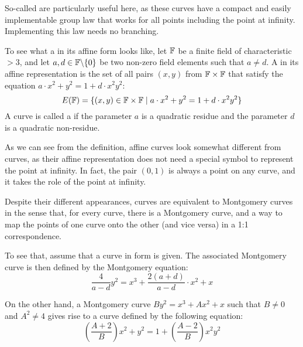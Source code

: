 So-called  are particularly useful here, as these curves have a compact and easily implementable group law that works for all points including the point at infinity. Implementing this law needs no branching. 

To see what a  in its affine form looks like, let $\mathbb{F}$ be a finite field of characteristic $>3$, and let $a,d\in \mathbb{F}\backslash\{0\}$ be two non-zero field elements such that $a\neq d$.  A  in its affine representation is  the set of all pairs $(x,y)$ from $\mathbb{F}\times \mathbb{F}$ that satisfy the  equation $a\cdot x^2+y^2= 1+d\cdot x^2y^2$:
\begin{equation}\label{eq:twisted-edwards}
E(\mathbb{F})=\{(x,y)\in\mathbb{F}\times\mathbb{F}\;|\; a\cdot x^2+y^2= 1+d\cdot x^2y^2\}
\end{equation} 
A  curve is called a  if the parameter $a$ is a quadratic residue and the parameter $d$ is a quadratic non-residue.

As we can see from the definition, affine  curves look somewhat different from  curves, as their affine representation does not need a special symbol to represent the point at infinity. In fact, the pair $(0,1)$ is always a point on any  curve, and it takes the role of the point at infinity.

Despite their different appearances,  curves are equivalent to Montgomery curves in the sense that, for every  curve, there is a Montgomery curve, and a way to map the points of one curve onto the other (and vice versa) in a 1:1 correspondence. 

To see that, assume that a curve in  form is given. The associated Montgomery curve is then defined by the Montgomery equation:
\begin{equation}
\frac{4}{a-d} y^2 = x^3 + \frac{2(a+d)}{a-d}\cdot x^2 + x 
\end{equation}

On the other hand, a Montgomery curve $By^{2}=x^{3}+Ax^{2}+x$ such that $B\neq 0$ and $A^2\neq 4$ gives rise to a  curve defined by the following equation:
\begin{equation}\label{eq:montgomery-to-twisted-edwards}
(\frac{A+2}{B})x^2+y^2= 1+(\frac{A-2}{B})x^2y^2
\end{equation}

